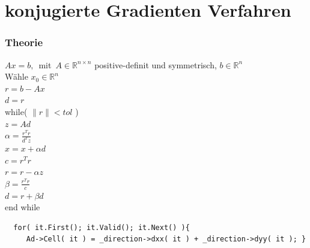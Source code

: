 \documentclass[]{beamer}
\begin{document}
\section{konjugierte Gradienten Verfahren}
\begin{frame}
\frametitle{Theorie}
$Ax = b,  $\, mit\, $ A \in \mathbb{R}^{n \times n}$ positive-definit und symmetrisch, $ b \in \mathbb{R}^n$
\\
Wähle $x_0 \in \mathbb{R}^n$
\\
$r = b - A x$
\\
$ d = r$
\\
while( $\| r \| < tol $ )
\\
\hspace*{1cm} $ z = Ad$
\\
\hspace*{1cm} $\alpha = \frac{ r^T r}{d^T z}$
\\
\hspace*{1cm} $x = x + \alpha d$
\\
\hspace*{1cm} $ c = r^T r$
\\
\hspace*{1cm} $r = r - \alpha z$
\\
\hspace*{1cm} $\beta = \frac{ r^T r}{ c }$
\\
\hspace*{1cm} $d = r + \beta d$
\\
end while
\end{frame}

\begin{verbatim}
  for( it.First(); it.Valid(); it.Next() ){
     Ad->Cell( it ) = _direction->dxx( it ) + _direction->dyy( it ); }
\end{verbatim}
\end{document}
